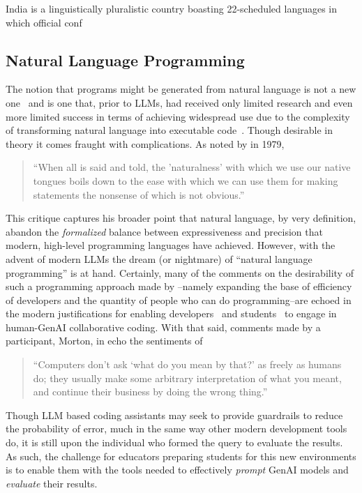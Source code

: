 India is a linguistically pluralistic country boasting 22-scheduled languages in
which official conf

\subsection{Natural Language Programming}

The notion that programs might be generated from natural language is not a new
one~\cite{sammet_use_1966, halpern_foundations_1966} and is one that, prior to
LLMs, had received only limited research and even more limited success in terms
of achieving widespread use due to the complexity of transforming natural
language into executable code~\cite{miller_natural_1981, mihalcea_nlp_2006,
lieberman_feasibility_2006}. Though desirable in theory it comes fraught with
complications. As noted by \citet{bauer_foolishness_1979} in 1979,
\begin{quote}
    ``When all is said and told, the 'naturalness' with which we use our native
    tongues boils down to the ease with which we can use them for making
    statements the nonsense of which is not obvious.''
\end{quote}
This critique captures his broader point that natural language, by very
definition, abandon the \textit{formalized} balance between expressiveness and
precision that modern, high-level programming languages have achieved. However,
with the advent of modern LLMs the dream (or nightmare) of ``natural language
programming'' is at hand. Certainly, many of the comments on the desirability of
such a programming approach made by \citet{sammet_use_1966}--namely expanding
the base of efficiency of developers and the quantity of people who can do
programming--are echoed in the modern justifications for enabling
developers~\cite{zhang_practices_2023} and
students~\cite{vadaparty_cs1-llm_2024} to engage in human-GenAI collaborative
coding. With that said, comments made by a participant, Morton, in
\citet{sammet_use_1966} echo the sentiments of \citet{bauer_foolishness_1979}
\begin{quote}
    ``Computers don't ask `what do you mean by that?' as freely as humans do;
    they usually make some arbitrary interpretation of what you meant, and
    continue their business by doing the wrong thing.''
\end{quote}
Though LLM based coding assistants may seek to provide guardrails to reduce the
probability of error, much in the same way other modern development tools do, it
is still upon the individual who formed the query to evaluate the results. As
such, the challenge for educators preparing students for this new environments
is to enable them with the tools needed to effectively \textit{prompt} GenAI
models and \textit{evaluate} their results.

